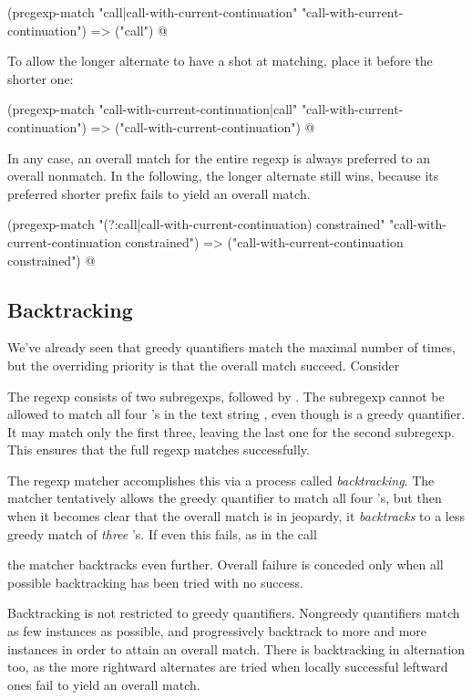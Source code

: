 {\q@
(pregexp-match "call|call-with-current-continuation"
  "call-with-current-continuation")
=> ("call")
@

To allow the longer alternate to have a shot at
matching, place it before the shorter one:

\q@
(pregexp-match "call-with-current-continuation|call"
  "call-with-current-continuation")
=> ("call-with-current-continuation")
@

In any case, an overall match for the entire regexp is
always preferred to an overall nonmatch.  In the
following, the longer alternate still wins, because its
preferred shorter prefix fails to yield an overall
match.

\q@
(pregexp-match "(?:call|call-with-current-continuation) constrained"
  "call-with-current-continuation constrained")
=> ("call-with-current-continuation constrained")
@

\subsection{Backtracking}

We've already seen that greedy quantifiers match
the maximal number of times, but the overriding priority
is that the overall match succeed.  Consider


\n The regexp consists of two subregexps,
 followed by .
The subregexp  cannot be allowed to match
all four 's in the text string , even though
\p{*} is a greedy quantifier.  It may match only the first
three, leaving the last one for the second subregexp.
This ensures that the full regexp matches successfully.

The regexp matcher accomplishes this via a process
called {\em backtracking}.  The matcher
tentatively allows the greedy quantifier
to match all four 's, but then when it becomes
clear that the overall match is in jeopardy, it
{\em backtracks} to a less greedy match of {\em
three} 's.  If even this fails, as in the
call


\n the matcher backtracks even further.  Overall
failure is conceded only when all possible backtracking
has been tried with no success.

Backtracking is not restricted to greedy quantifiers.
Nongreedy quantifiers match as few instances as
possible, and progressively backtrack to more and more
instances in order to attain an overall match.  There
is backtracking in alternation too, as the more
rightward alternates are tried when locally successful
leftward ones fail to yield an overall match.

}
